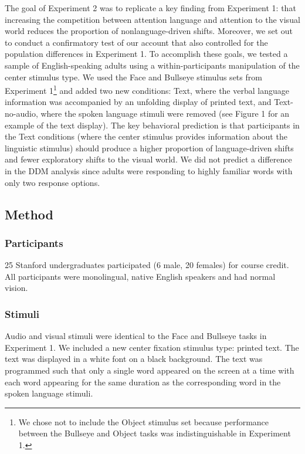 \documentclass[10pt, letterpaper]{article}
\begin{document}
The goal of Experiment 2 was to replicate a key finding from Experiment
1: that increasing the competition between attention language and
attention to the visual world reduces the proportion of
nonlanguage-driven shifts. Moreover, we set out to conduct a
confirmatory test of our account that also controlled for the population
differences in Experiment 1. To accomplish these goals, we tested a
sample of English-speaking adults using a within-participants
manipulation of the center stimulus type. We used the Face and Bullseye
stimulus sets from Experiment 1\footnote{We chose not to include the
  Object stimulus set because performance between the Bullseye and
  Object tasks was indistinguishable in Experiment 1.} and added two new
conditions: Text, where the verbal language information was accompanied
by an unfolding display of printed text, and Text-no-audio, where the
spoken language stimuli were removed (see Figure 1 for an example of the
text display). The key behavioral prediction is that participants in the
Text conditions (where the center stimulus provides information about
the linguistic stimulus) should produce a higher proportion of
language-driven shifts and fewer exploratory shifts to the visual world.
We did not predict a difference in the DDM analysis since adults were
responding to highly familiar words with only two response options.

\subsection{Method}\label{method-1}

\subsubsection{Participants}\label{participants-1}

25 Stanford undergraduates participated (6 male, 20 females) for course
credit. All participants were monolingual, native English speakers and
had normal vision.

\subsubsection{Stimuli}\label{stimuli-1}

Audio and visual stimuli were identical to the Face and Bullseye tasks
in Experiment 1. We included a new center fixation stimulus type:
printed text. The text was displayed in a white font on a black
background. The text was programmed such that only a single word
appeared on the screen at a time with each word appearing for the same
duration as the corresponding word in the spoken language stimuli.
\end{document}

